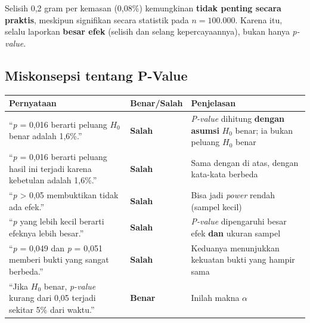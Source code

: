 \documentclass[
  indonesian,
  letterpaper,
]{book}
\newcounter{none} %
\begin{document}
Selisih 0,2 gram per kemasan (0,08\%) kemungkinan \textbf{tidak penting
secara praktis}, meskipun signifikan secara statistik pada
\(n = 100.000\). Karena itu, selalu laporkan \textbf{besar efek}
(selisih dan selang kepercayaannya), bukan hanya \emph{p-value}.

\subsection{Miskonsepsi tentang
P-Value}\label{miskonsepsi-tentang-p-value}

{\def\LTcaptype{none} %
\begin{longtable}[]{@{}
  >{\raggedright\arraybackslash}p{}
  >{\centering\arraybackslash}p{}
  >{\raggedright\arraybackslash}p{}@{}}
\toprule\noalign{}
\begin{minipage}[b]{\linewidth}\raggedright
Pernyataan
\end{minipage} & \begin{minipage}[b]{\linewidth}\centering
Benar/Salah
\end{minipage} & \begin{minipage}[b]{\linewidth}\raggedright
Penjelasan
\end{minipage} \\
\midrule\noalign{}
\endhead
\bottomrule\noalign{}
\endlastfoot
``\emph{p} = 0,016 berarti peluang \(H_0\) benar adalah 1,6\%.'' &
\textbf{Salah} & \emph{P-value} dihitung \textbf{dengan asumsi} \(H_0\)
benar; ia bukan peluang \(H_0\) benar \\
``\emph{p} = 0,016 berarti peluang hasil ini terjadi karena kebetulan
adalah 1,6\%.'' & \textbf{Salah} & Sama dengan di atas, dengan kata-kata
berbeda \\
``\emph{p} \textgreater{} 0,05 membuktikan tidak ada efek.'' &
\textbf{Salah} & Bisa jadi \emph{power} rendah (sampel kecil) \\
``\emph{p} yang lebih kecil berarti efeknya lebih besar.'' &
\textbf{Salah} & \emph{P-value} dipengaruhi besar efek \textbf{dan}
ukuran sampel \\
``\emph{p} = 0,049 dan \emph{p} = 0,051 memberi bukti yang sangat
berbeda.'' & \textbf{Salah} & Keduanya menunjukkan kekuatan bukti yang
hampir sama \\
``Jika \(H_0\) benar, \emph{p-value} kurang dari 0,05 terjadi sekitar
5\% dari waktu.'' & \textbf{Benar} & Inilah makna \(\alpha\) \\
\end{longtable}
}
\end{document}
